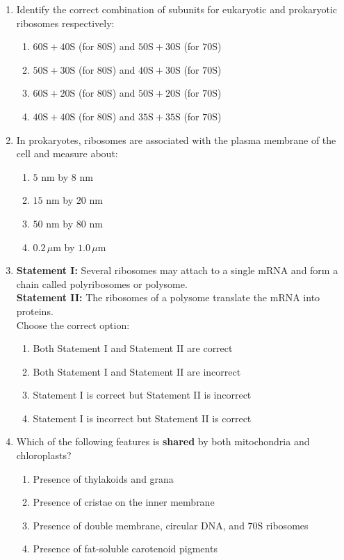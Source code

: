 \documentclass[11pt, a4paper]{article}
\begin{document}
\begin{enumerate}[label=\textbf{\arabic*.}, leftmargin=*, itemsep=8pt]
    \item Identify the correct combination of subunits for eukaryotic and prokaryotic ribosomes respectively:
    \begin{enumerate}[label=(\alph*)]
        \item $60\text{S} + 40\text{S}$ (for $80\text{S}$) and $50\text{S} + 30\text{S}$ (for $70\text{S}$)
        \item $50\text{S} + 30\text{S}$ (for $80\text{S}$) and $40\text{S} + 30\text{S}$ (for $70\text{S}$)
        \item $60\text{S} + 20\text{S}$ (for $80\text{S}$) and $50\text{S} + 20\text{S}$ (for $70\text{S}$)
        \item $40\text{S} + 40\text{S}$ (for $80\text{S}$) and $35\text{S} + 35\text{S}$ (for $70\text{S}$)
    \end{enumerate}

    \item In prokaryotes, ribosomes are associated with the plasma membrane of the cell and measure about:
    \begin{enumerate}[label=(\alph*)]
        \item $5\text{ nm}$ by $8\text{ nm}$
        \item $15\text{ nm}$ by $20\text{ nm}$
        \item $50\text{ nm}$ by $80\text{ nm}$
        \item $0.2\,\mu\text{m}$ by $1.0\,\mu\text{m}$
    \end{enumerate}

    \item \textbf{Statement I:} Several ribosomes may attach to a single mRNA and form a chain called polyribosomes or polysome.\\
    \textbf{Statement II:} The ribosomes of a polysome translate the mRNA into proteins.\\
    Choose the correct option:
    \begin{enumerate}[label=(\alph*)]
        \item Both Statement I and Statement II are correct
        \item Both Statement I and Statement II are incorrect
        \item Statement I is correct but Statement II is incorrect
        \item Statement I is incorrect but Statement II is correct
    \end{enumerate}

    \item Which of the following features is \textbf{shared} by both mitochondria and chloroplasts?
    \begin{enumerate}[label=(\alph*)]
        \item Presence of thylakoids and grana
        \item Presence of cristae on the inner membrane
        \item Presence of double membrane, circular DNA, and $70\text{S}$ ribosomes
        \item Presence of fat-soluble carotenoid pigments
    \end{enumerate}


\end{enumerate}
\end{document}
